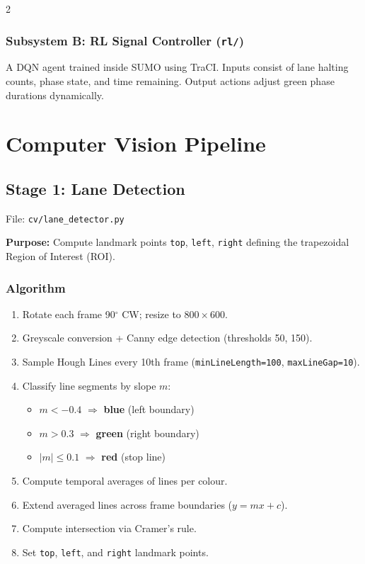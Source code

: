 \documentclass[10pt, a4paper]{article}
\begin{document}
\begin{multicols}{2}
\subsubsection{Subsystem B: RL Signal Controller (\texttt{rl/})}
A DQN agent trained inside SUMO using TraCI. Inputs consist of lane halting
counts, phase state, and time remaining. Output actions adjust green phase
durations dynamically.

\section{Computer Vision Pipeline}

\subsection{Stage 1: Lane Detection}
File: \texttt{cv/lane\_detector.py}

\textbf{Purpose:} Compute landmark points \texttt{top}, \texttt{left},
\texttt{right} defining the trapezoidal Region of Interest (ROI).

\subsubsection{Algorithm}
\begin{enumerate}
  \item Rotate each frame 90$^\circ$ CW; resize to $800\times600$.
  \item Greyscale conversion + Canny edge detection (thresholds 50, 150).
  \item Sample Hough Lines every 10th frame
        (\texttt{minLineLength=100}, \texttt{maxLineGap=10}).
  \item Classify line segments by slope $m$:
        \begin{itemize}
          \item $m < -0.4$ $\Rightarrow$ \textbf{blue} (left boundary)
          \item $m > 0.3$  $\Rightarrow$ \textbf{green} (right boundary)
          \item $|m| \le 0.1$ $\Rightarrow$ \textbf{red} (stop line)
        \end{itemize}
  \item Compute temporal averages of lines per colour.
  \item Extend averaged lines across frame boundaries ($y = mx + c$).
  \item Compute intersection via Cramer's rule.
  \item Set \texttt{top}, \texttt{left}, and \texttt{right} landmark points.
\end{enumerate}


\end{multicols}
\end{document}
